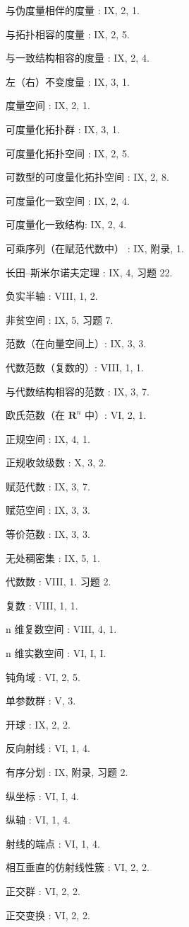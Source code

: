 与伪度量相伴的度量 : IX, 2, 1.

与拓扑相容的度量 : IX, 2, 5.

与一致结构相容的度量 : IX, 2, 4.

左（右）不变度量 : IX, 3, 1.

度量空间 : IX, 2, 1.

可度量化拓扑群 : IX, 3, 1.

可度量化拓扑空间 : IX, 2, 5.

可数型的可度量化拓扑空间 : IX, 2, 8.

可度量化一致空间 : IX, 2, 4.

可度量化一致结构: IX, 2, 4.

可乘序列（在赋范代数中） : IX, 附录, 1.

长田–斯米尔诺夫定理 : IX, 4, 习题 22.

负实半轴 : VIII, 1, 2.

非贫空间 : IX, 5, 习题 7.

范数（在向量空间上）: IX, 3, 3.

代数范数（复数的）: VIII, 1, 1.

与代数结构相容的范数 : IX, 3, 7.

欧氏范数（在 \(\mathbf{R}^n\) 中）: VI, 2, 1.

正规空间 : IX, 4, 1.

正规收敛级数 : X, 3, 2.

赋范代数 : IX, 3, 7.

赋范空间 : IX, 3, 3.

等价范数 : IX, 3, 3.

无处稠密集 : IX, 5, 1.

代数数 : VIII, 1. 习题 2.

复数 : VIII, 1, 1.

n 维复数空间 : VIII, 4, 1.

n 维实数空间 : VI, I, I.

钝角域 : VI, 2, 5.

单参数群 : V, 3.

开球 : IX, 2, 2.

反向射线 : VI, 1, 4.

有序分划 : IX, 附录, 习题 2.

纵坐标 : VI, I, 4.

纵轴 : VI, 1, 4.

射线的端点 : VI, 1, 4.

相互垂直的仿射线性簇 : VI, 2, 2.

正交群 : VI, 2, 2.

正交变换 : VI, 2, 2.

